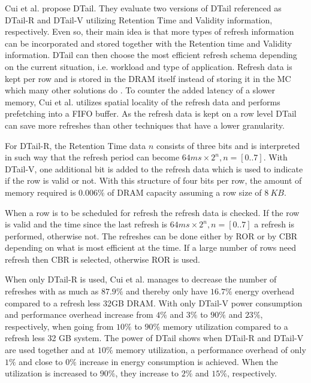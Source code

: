 Cui et al. \cite{dtail} propose DTail. They evaluate two versions of DTail referenced as DTail-R and DTail-V utilizing Retention Time and Validity information, respectively. Even so, their main idea is that more types of refresh information can be incorporated and stored together with the Retention time and Validity information. DTail can then choose the most efficient refresh schema depending on the current situation, i.e. workload and type of application. Refresh data is kept per row and is stored in the DRAM itself instead of storing it in the MC which many other solutions do \cite{raidr}\cite{smartrefresh}\cite{refrint}. To counter the added latency of a slower memory, Cui et al. utilizes spatial locality of the refresh data and performs prefetching into a FIFO buffer. As the refresh data is kept on a row level DTail can save more refreshes than other techniques that have a lower granularity.

For DTail-R, the Retention Time data $n$ consists of three bits and is interpreted in such way that the refresh period can become \(64ms \times 2^n, n = [0..7]\). With DTail-V, one additional bit is added to the refresh data which is used to indicate if the row is valid or not. With this structure of four bits per row, the amount of memory required is $0.006\%$ of DRAM capacity assuming a row size of $8\:KB$. 

When a row is to be scheduled for refresh the refresh data is checked. If the row is valid and the time since the last refresh is \(64ms \times 2^n, n = [0..7]\) a refresh is performed, otherwise not. The refreshes can be done either by ROR or by CBR depending on what is most efficient at the time. If a large number of rows need refresh then CBR is selected, otherwise ROR is used. 

When only DTail-R is used, Cui et al. manages to decrease the number of refreshes with as much as $87.9\%$ and thereby only have $16.7\%$ energy overhead compared to a refresh less 32GB DRAM. With only DTail-V power consumption and performance overhead increase from $4\%$ and $3\%$ to $90\%$ and $23\%$, respectively, when going from $10\%$ to $90\%$ memory utilization compared to a refresh less 32 GB system. The power of DTail shows when DTail-R and DTail-V are used together and at $10\%$ memory utilization, a performance overhead of only $1\%$ and close to $0\%$ increase in energy consumption is achieved. When the utilization is increased to $90\%$, they increase to $2\%$ and $15\%$, respectively.